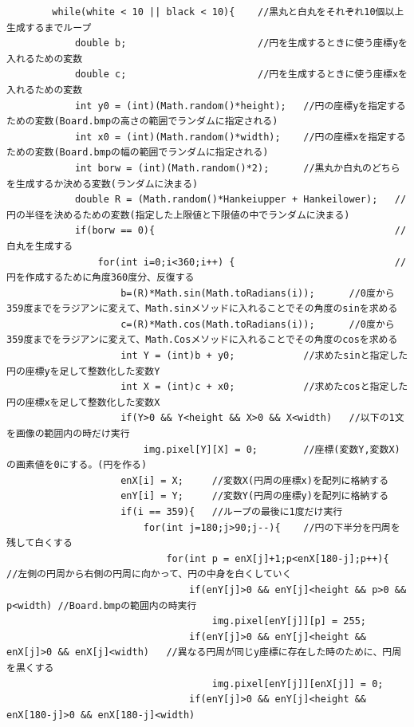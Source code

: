 \documentclass{jsarticle}
\begin{document}
\begin{verbatim}
        while(white < 10 || black < 10){    //黒丸と白丸をそれぞれ10個以上生成するまでループ
            double b;                       //円を生成するときに使う座標yを入れるための変数
            double c;                       //円を生成するときに使う座標xを入れるための変数
            int y0 = (int)(Math.random()*height);   //円の座標yを指定するための変数(Board.bmpの高さの範囲でランダムに指定される)
            int x0 = (int)(Math.random()*width);    //円の座標xを指定するための変数(Board.bmpの幅の範囲でランダムに指定される)
            int borw = (int)(Math.random()*2);      //黒丸か白丸のどちらを生成するか決める変数(ランダムに決まる)
            double R = (Math.random()*Hankeiupper + Hankeilower);   //円の半径を決めるための変数(指定した上限値と下限値の中でランダムに決まる)
            if(borw == 0){                                          //白丸を生成する
                for(int i=0;i<360;i++) {                            //円を作成するために角度360度分、反復する
                    b=(R)*Math.sin(Math.toRadians(i));      //0度から359度までをラジアンに変えて、Math.sinメソッドに入れることでその角度のsinを求める
                    c=(R)*Math.cos(Math.toRadians(i));      //0度から359度までをラジアンに変えて、Math.Cosメソッドに入れることでその角度のcosを求める
                    int Y = (int)b + y0;            //求めたsinと指定した円の座標yを足して整数化した変数Y
                    int X = (int)c + x0;            //求めたcosと指定した円の座標xを足して整数化した変数X
                    if(Y>0 && Y<height && X>0 && X<width)   //以下の1文を画像の範囲内の時だけ実行
                        img.pixel[Y][X] = 0;        //座標(変数Y,変数X)の画素値を0にする。(円を作る)
                    enX[i] = X;     //変数X(円周の座標x)を配列に格納する
                    enY[i] = Y;     //変数Y(円周の座標y)を配列に格納する
                    if(i == 359){   //ループの最後に1度だけ実行
                        for(int j=180;j>90;j--){    //円の下半分を円周を残して白くする
                            for(int p = enX[j]+1;p<enX[180-j];p++){     //左側の円周から右側の円周に向かって、円の中身を白くしていく
                                if(enY[j]>0 && enY[j]<height && p>0 && p<width) //Board.bmpの範囲内の時実行
                                    img.pixel[enY[j]][p] = 255;
                                if(enY[j]>0 && enY[j]<height && enX[j]>0 && enX[j]<width)   //異なる円周が同じy座標に存在した時のために、円周を黒くする
                                    img.pixel[enY[j]][enX[j]] = 0;
                                if(enY[j]>0 && enY[j]<height && enX[180-j]>0 && enX[180-j]<width)

\end{verbatim}
\end{document}
